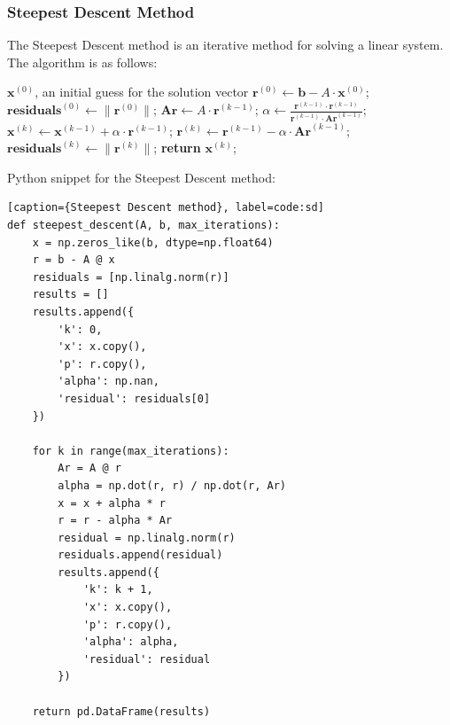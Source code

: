 \documentclass[10pt]{article}
\begin{document}
\subsubsection{Steepest Descent Method}
The Steepest Descent method is an iterative method for solving a linear system. The algorithm is as follows:
\begin{algorithm}[H]
\caption{Steepest Descent Method}
\begin{algorithmic}
\State $\mathbf{x}^{(0)}$, an initial guess for the solution vector\;
\State $\mathbf{r}^{(0)} \gets \mathbf{b} - A \cdot \mathbf{x}^{(0)}$;
\State $\mathbf{residuals}^{(0)} \gets \lVert \mathbf{r}^{(0)} \rVert$;
    \State $\mathbf{Ar} \gets A \cdot \mathbf{r}^{(k-1)}$;
    \State $\alpha \gets \frac{\mathbf{r}^{(k-1)} \cdot \mathbf{r}^{(k-1)}}{\mathbf{r}^{(k-1)} \cdot \mathbf{Ar}^{(k-1)}}$;
    \State $\mathbf{x}^{(k)} \gets \mathbf{x}^{(k-1)} + \alpha \cdot \mathbf{r}^{(k-1)}$;
    \State $\mathbf{r}^{(k)} \gets \mathbf{r}^{(k-1)} - \alpha \cdot \mathbf{Ar}^{(k-1)}$;
    \State $\mathbf{residuals}^{(k)} \gets \lVert \mathbf{r}^{(k)} \rVert$;
\EndFor
\State \textbf{return} $\mathbf{x}^{(k)}$;
\end{algorithmic}
\end{algorithm}
Python snippet for the Steepest Descent method:
\begin{lstlisting}[style=custompython][caption={Steepest Descent method}, label=code:sd]
def steepest_descent(A, b, max_iterations):
    x = np.zeros_like(b, dtype=np.float64)
    r = b - A @ x
    residuals = [np.linalg.norm(r)]
    results = []
    results.append({
        'k': 0,
        'x': x.copy(),
        'p': r.copy(),
        'alpha': np.nan,
        'residual': residuals[0]
    })
    
    for k in range(max_iterations):
        Ar = A @ r
        alpha = np.dot(r, r) / np.dot(r, Ar)
        x = x + alpha * r
        r = r - alpha * Ar
        residual = np.linalg.norm(r)
        residuals.append(residual)
        results.append({
            'k': k + 1,
            'x': x.copy(),
            'p': r.copy(),
            'alpha': alpha,
            'residual': residual
        })
    
    return pd.DataFrame(results)
\end{lstlisting}
\end{document}
